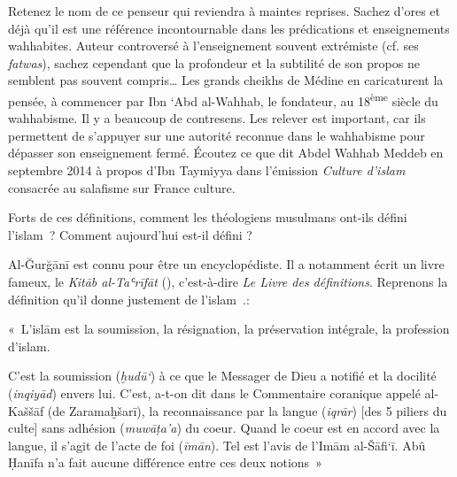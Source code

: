 Retenez le nom de ce penseur qui reviendra à maintes reprises. Sachez
d'ores et déjà qu'il est une référence incontournable dans les
prédications et enseignements wahhabites. Auteur controversé à
l'enseignement souvent extrémiste (cf. ses \emph{fatwas}), sachez
cependant que la profondeur et la subtilité de son propos ne semblent
pas souvent compris\ldots{} Les grands cheikhs de Médine en caricaturent
la pensée, à commencer par Ibn `Abd al-Wahhab, le fondateur, au
18\textsuperscript{ème} siècle du wahhabisme. Il y a beaucoup de
contresens. Les relever est important, car ils permettent de s'appuyer
sur une autorité reconnue dans le wahhabisme pour dépasser son
enseignement fermé.
 Écoutez ce que dit Abdel Wahhab Meddeb en septembre
  2014 à propos d'Ibn Taymiyya dans l'émission \emph{Culture d'islam}
  consacrée au salafisme sur France culture.


Forts de ces définitions, comment les théologiens musulmans ont-ils
défini l'islam~? Comment aujourd'hui est-il défini ?



Al-Ğurğānī est connu pour être un encyclopédiste. Il a notamment écrit
un livre fameux, le \emph{Kitāb al-Taʿrīfāt} (),
c'est-à-dire \emph{Le Livre des définitions}. Reprenons la définition
qu'il donne justement de l'islam~.:


\begin{Def}
«~L'islām est la soumission, la résignation, la préservation intégrale,
la profession d'islam.

C'est la soumission (\emph{ḫudū`}) à ce que le Messager de Dieu a
notifié et la docilité (\emph{inqiyād}) envers lui. C'est, a-t-on dit
dans le Commentaire coranique appelé al-Kaššāf (de Zaramaḫšarī), la
reconnaissance par la langue (\emph{iqrār}) {[}des 5 piliers du culte{]}
sans adhésion (\emph{muwāṭa'a}) du coeur. Quand le coeur est en accord
avec la langue, il s'agit de l'acte de foi (\emph{īmān}). Tel est l'avis
de l'Imām al-Šāfi`ī. Abû Ḥanīfa n'a fait aucune différence entre ces
deux notions~»
\end{Def}


